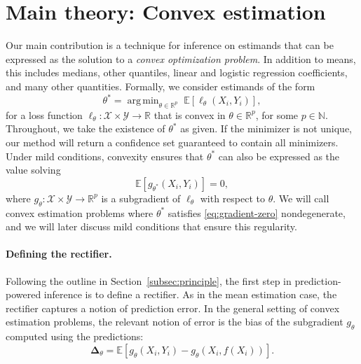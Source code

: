 \documentclass[10pt]{article}
\def\R{\mathbb{R}}
\def\E{\mathbb{E}}
\def\N{\mathbb{N}}
\newcommand{\Y}{\mathcal{Y}}
\newcommand{\X}{\mathcal{X}}
\newcommand{\rec}{\mathbf{\Delta}}
\DeclareMathOperator*{\argmin}{arg\,min}
\begin{document}
\section{Main theory: Convex estimation}
\label{sec:convex}

Our main contribution is a technique for inference on estimands that can be expressed as the solution to a \emph{convex optimization problem}.
In addition to means, this includes medians, other quantiles, linear and logistic regression coefficients, and many other quantities.
Formally, we consider estimands of the form
\begin{equation}
    \label{eq:convex-minimizer}
    \theta^* = \argmin_{\theta \in\R^p} \; \E\left[\ell_{\theta}(X_i, Y_i)\right],
\end{equation}
for a loss function $\ell_{\theta} : \X \times \Y \to \R$ that is convex in $\theta \in \R^p$, for some $p\in\N$.
Throughout, we take the existence of $\theta^*$ as given.
If the minimizer is not unique, our method will return a confidence set guaranteed to contain all minimizers.
Under mild conditions, convexity ensures that $\theta^*$ can also be expressed as the value solving
\begin{equation}
    \label{eq:gradient-zero}
    \E\left[g_{\theta^*}(X_i, Y_i) \right] = 0,
\end{equation}
where $g_{\theta} : \X \times \Y \to \R^p$ is a subgradient of $\ell_{\theta}$ with respect to $\theta$.
We will call convex estimation problems where $\theta^*$ satisfies \eqref{eq:gradient-zero} nondegenerate, and we will later discuss mild conditions that ensure this regularity.




\paragraph{Defining the rectifier.} Following the outline in Section~\ref{subsec:principle}, the first step in prediction-powered inference is to define a rectifier.
As in the mean estimation case, the rectifier captures a notion of prediction error. In the general setting of convex estimation problems, the relevant notion of error is the bias of the subgradient $g_{\theta}$ computed using the predictions:
\begin{equation}
\label{eq:convex-rectifier}
    \rec_{\theta} = \E \left[g_\theta(X_i, Y_i) - g_\theta(X_i, f(X_i))\right].
\end{equation}
\end{document}
